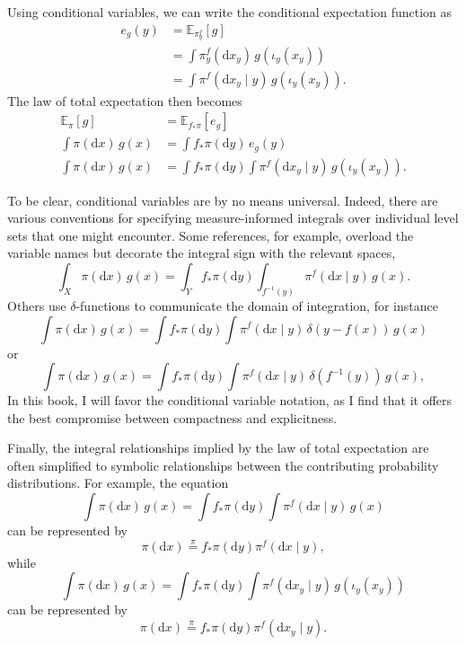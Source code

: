 \documentclass[
  letterpaper,
  DIV=11,
  numbers=noendperiod]{scrartcl}
\begin{document}
Using conditional variables, we can write the conditional expectation
function as \begin{align*}
e_{g}(y)
&=
\mathbb{E}_{ \pi^{f}_{y} } \! \left[  g  \right]
\\
&=
\int \pi^{f}_{y}( \mathrm{d} x_{y} ) \, g( \iota_{y}(x_{y}))
\\
&=
\int \pi^{f}( \mathrm{d} x_{y} \mid y ) \, g( \iota_{y}(x_{y})).
\end{align*} The law of total expectation then becomes \begin{align*}
\mathbb{E}_{\pi} \! \left[ g \right]
&=
\mathbb{E}_{ f_{*} \pi } \! \left[ e_{g} \right]
\\
\int \pi( \mathrm{d} x ) \, g(x)
&=
\int f_{*} \pi (\mathrm{d} y) \, e_{g}(y)
\\
\int \pi( \mathrm{d} x ) \, g(x)
&=
\int f_{*} \pi (\mathrm{d} y)
\int \pi^{f}( \mathrm{d} x_{y} \mid y ) \, g( \iota_{y}(x_{y})).
\end{align*}

To be clear, conditional variables are by no means universal. Indeed,
there are various conventions for specifying measure-informed integrals
over individual level sets that one might encounter. Some references,
for example, overload the variable names but decorate the integral sign
with the relevant spaces, \[
\int_{X} \pi( \mathrm{d} x ) \, g(x)
=
\int_{Y}         f_{*} \pi (\mathrm{d} y)
\int_{f^{-1}(y)} \pi^{f}( \mathrm{d} x \mid y ) \, g(x).
\] Others use \(\delta\)-functions to communicate the domain of
integration, for instance \[
\int \pi( \mathrm{d} x ) \, g(x)
=
\int f_{*} \pi (\mathrm{d} y)
\int \pi^{f}( \mathrm{d} x \mid y ) \, \delta(y - f(x)) \, g(x)
\] or \[
\int \pi( \mathrm{d} x ) \, g(x)
=
\int f_{*} \pi (\mathrm{d} y)
\int \pi^{f}( \mathrm{d} x \mid y ) \, \delta(f^{-1}(y)) \, g(x),
\] In this book, I will favor the conditional variable notation, as I
find that it offers the best compromise between compactness and
explicitness.

Finally, the integral relationships implied by the law of total
expectation are often simplified to symbolic relationships between the
contributing probability distributions. For example, the equation \[
\int \pi( \mathrm{d} x ) \, g(x)
=
\int f_{*} \pi (\mathrm{d} y)
\int \pi^{f}( \mathrm{d} x \mid y ) \, g(x)
\] can be represented by \[
\pi( \mathrm{d} x )
\overset{ \pi }{ = }
f_{*} \pi (\mathrm{d} y) \pi^{f}( \mathrm{d} x \mid y ),
\] while \[
\int \pi( \mathrm{d} x ) \, g(x)
=
\int f_{*} \pi (\mathrm{d} y)
\int \pi^{f}( \mathrm{d} x_{y} \mid y ) \, g( \iota_{y}(x_{y}))
\] can be represented by \[
\pi( \mathrm{d} x )
\overset{ \pi }{ = }
f_{*} \pi (\mathrm{d} y) \pi^{f}( \mathrm{d} x_{y} \mid y ).
\]
\end{document}
